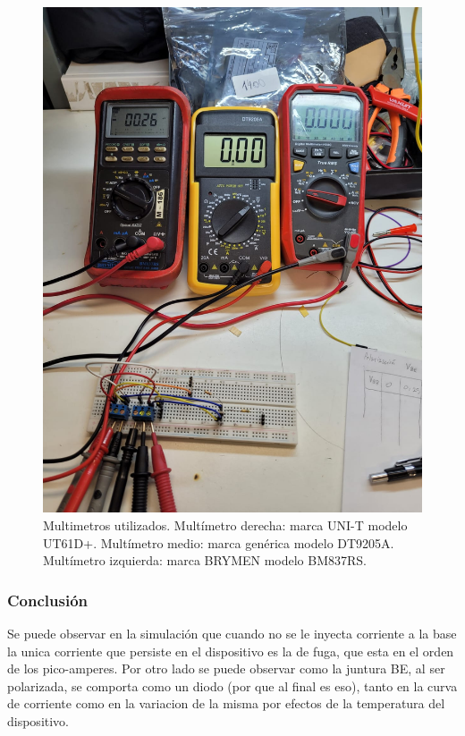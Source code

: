 \documentclass[chaptersright]{informeutn}
\begin{document}
\begin{figure}[H]
\begin{minipage}{0.40\textwidth}
          \includegraphics[width=\textwidth]{pictures/multimetros-juntura-be.jpeg}
          \caption{Multimetros utilizados. Multímetro derecha: marca UNI-T modelo UT61D+. Multímetro medio: marca genérica modelo DT9205A. Multímetro izquierda: marca BRYMEN modelo BM837RS.}
          \label{fig:multimetros}
        \end{minipage}
        \end{figure}

        \subsubsection{Conclusión}

          Se puede observar en la simulación que cuando no se le inyecta corriente a la base la unica corriente que
          persiste en el dispositivo es la de fuga, que esta en el orden de los pico-amperes. Por otro lado se puede
          observar como la juntura BE, al ser polarizada, se comporta como un diodo (por que al final es eso), tanto en
          la curva de corriente como en la variacion de la misma por efectos de la temperatura del dispositivo.
        
\end{document}
